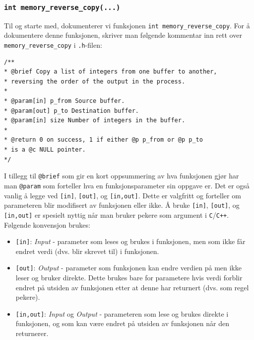 \begin{alphasection}
\cprotect\subsubsection{\lstinline{int memory_reverse_copy(...)}}
Til og starte med, dokumenterer vi funksjonen \verb|int memory_reverse_copy|. For å dokumentere denne funksjonen, skriver man følgende kommentar inn rett
over \verb|memory_reverse_copy| i \verb|.h|-filen:

\begin{lstlisting}
/**
* @brief Copy a list of integers from one buffer to another,
* reversing the order of the output in the process.
*
* @param[in] p_from Source buffer.
* @param[out] p_to Destination buffer.
* @param[in] size Number of integers in the buffer.
*
* @return 0 on success, 1 if either @p p_from or @p p_to
* is a @c NULL pointer.
*/
\end{lstlisting}

I tillegg til \verb|@brief| som gir en kort oppsummering av hva funksjonen gjør har man \verb|@param| som forteller hva en funksjonsparameter sin oppgave er. Det er også vanlig å legge ved \verb|[in]|, \verb|[out]|, og \verb|[in,out]|. Dette er valgfritt og forteller om parameteren blir modifisert av funksjonen eller ikke. Å bruke \verb|[in]|, \verb|[out]|, og \verb|[in,out]| er spesielt nyttig når man bruker pekere som argument i \verb|C|/\verb|C++|. Følgende konvensjon brukes:

\begin{itemize}
    \item \verb|[in]|: \textit{Input} - parameter som leses og brukes i funksjonen, men som ikke får endret verdi (dvs. blir skrevet til) i funksjonen. 
    \item \verb|[out]|: \textit{Output} - parameter som funksjonen kan endre verdien på men ikke leser og bruker direkte. Dette brukes bare for parametere hvis verdi forblir endret på utsiden av funksjonen etter at denne har returnert (dvs. som regel pekere).
    \item \verb|[in,out]|: \textit{Input} og \textit{Output} - parameteren som lese og brukes direkte i funksjonen, og som kan være endret på utsiden av funksjonen når den returnerer.
\end{itemize}


\end{alphasection}
